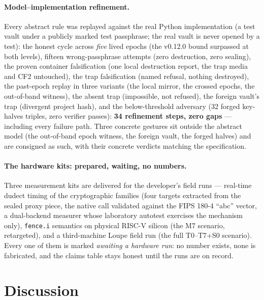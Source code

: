 \documentclass[11pt,a4paper]{article}
\newcommand{\code}[1]{\texttt{\small #1}}
\begin{document}
\paragraph{Model--implementation refinement.} Every abstract rule was
replayed against the real Python implementation (a test vault under a
publicly marked test passphrase; the real vault is never opened by a
test): the honest cycle across \emph{five} lived epochs (the v0.12.0
bound surpassed at both levels), fifteen wrong-passphrase attempts
(zero destruction, zero sealing), the proven container falsification
(one local destruction report, the trap media and CF2 untouched), the
trap falsification (named refusal, nothing destroyed), the past-epoch
replay in three variants (the local mirror, the crossed epochs, the
out-of-band witness), the absent trap (impossible, not refused), the
foreign vault's trap (divergent project hash), and the below-threshold
adversary (32 forged key-halves triples, zero verifier passes):
\textbf{34 refinement steps, zero gaps} --- including every failure
path. Three concrete gestures sit outside the abstract model (the
out-of-band epoch witness, the foreign vault, the forged halves) and
are consigned as such, with their concrete verdicts matching the
specification.

\paragraph{The hardware kits: prepared, waiting, no numbers.} Three
measurement kits are delivered for the developer's field runs ---
real-time dudect timing of the cryptographic families (four targets
extracted from the sealed proxy piece, the native call validated
against the FIPS 180-4 ``abc'' vector, a dual-backend measurer whose
laboratory autotest exercises the mechanism only), \code{fence.i}
semantics on physical RISC-V silicon (the M7 scenario, retargeted),
and a third-machine Loupe field run (the full T0--T7+S0 scenario).
Every one of them is marked \emph{awaiting a hardware run}: no number
exists, none is fabricated, and the claims table stays honest until
the runs are on record.



\section{Discussion}\label{sec:discussion}
\end{document}
